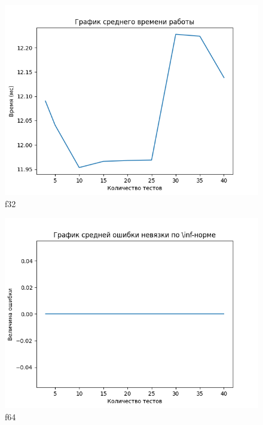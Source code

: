 \documentclass[12pt]{article}
\begin{document}
	\begin{figure}[h]
		\centering
		\includegraphics[width=16cm]{"../plots/plot-total-t3-f32.png"}
		\caption{f32}
		\label{fig:t-t3-f32}
	\end{figure}
	
	\begin{figure}[h]
		\centering
		\includegraphics[width=16cm]{"../plots/plot-total-t1-f64.png"}
		\caption{f64}
		\label{fig:t-t1-f64}
	\end{figure}
	
\end{document}
